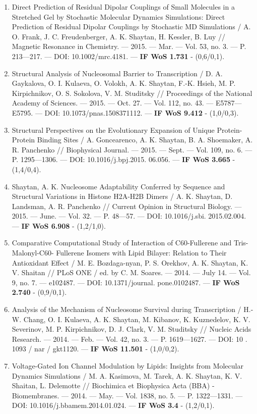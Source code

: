 \begin{frame}[allowframebreaks]
\begin{enumerate}
 \item  Direct Prediction of Residual Dipolar Couplings of Small Molecules in a Stretched Gel by Stochastic Molecular Dynamics Simulations: Direct Prediction of Residual Dipolar Couplings by Stochastic MD Simulations / A. O. Frank, J. C. Freudenberger, A. K. Shaytan, H. Kessler, B. Luy // Magnetic Resonance in Chemistry. –– 2015. –– Mar. –– Vol. 53, no. 3. –– P. 213––217. –– DOI: 10.1002/mrc.4181. –– \textbf{IF WoS 1.731} - (0,6/0,1).
 \item  Structural Analysis of Nucleosomal Barrier to Transcription / D. A. Gaykalova, O. I. Kulaeva, O. Volokh, A. K. Shaytan, F.-K. Hsieh, M. P. Kirpichnikov, O. S. Sokolova, V. M. Studitsky // Proceedings of the National Academy of Sciences. –– 2015. –– Oct. 27. –– Vol. 112,
no. 43. –– E5787––E5795. –– DOI: 10.1073/pnas.1508371112. –– \textbf{IF WoS 9.412} - (1,0/0,3).
 \item  Structural Perspectives on the Evolutionary Expansion of Unique Protein-Protein Binding Sites / A. Goncearenco, A. K. Shaytan, B. A. Shoemaker, A. R. Panchenko // Biophysical Journal. –– 2015. –– Sept. –– Vol. 109, no. 6. –– P. 1295––1306. –– DOI: 10.1016/j.bpj.2015. 06.056. –– \textbf{IF WoS 3.665} - (1,4/0,4).
 \item  Shaytan, A. K. Nucleosome Adaptability Conferred by Sequence and Structural Variations in Histone H2A-H2B Dimers / A. K. Shaytan, D. Landsman, A. R. Panchenko // Current Opinion in Structural Biology. –– 2015. –– June. –– Vol. 32. –– P. 48––57. –– DOI: 10.1016/j.sbi. 2015.02.004. –– \textbf{IF WoS 6.908} - (1,2/1,0).
 \item  Comparative Computational Study of Interaction of C60-Fullerene and Tris-Malonyl-C60- Fullerene Isomers with Lipid Bilayer: Relation to Their Antioxidant Effect / M. E. Bozdaga-nyan, P. S. Orekhov, A. K. Shaytan, K. V. Shaitan // PLoS ONE / ed. by C. M. Soares. –– 2014. –– July 14. –– Vol. 9, no. 7. –– e102487. –– DOI: 10.1371/journal. pone.0102487. –– \textbf{IF WoS 2.740} - (0,9/0,1).
 \item  Analysis of the Mechanism of Nucleosome Survival during Transcription / H.-W. Chang, O. I. Kulaeva, A. K. Shaytan, M. Kibanov, K. Kuznedelov, K. V. Severinov, M. P. Kirpichnikov, D. J. Clark, V. M. Studitsky // Nucleic Acids Research. –– 2014. –– Feb. –– Vol. 42,
no. 3. –– P. 1619––1627. –– DOI: 10 . 1093 / nar / gkt1120. –– \textbf{IF WoS 11.501} - (1,0/0,2).
 \item  Voltage-Gated Ion Channel Modulation by Lipids: Insights from Molecular Dynamics Simulations / M. A. Kasimova, M. Tarek, A. K. Shaytan, K. V. Shaitan, L. Delemotte // Biochimica et Biophysica Acta (BBA) - Biomembranes. –– 2014. –– May. –– Vol. 1838, no. 5. –– P. 1322––1331. –– DOI: 10.1016/j.bbamem.2014.01.024. –– \textbf{IF WoS 3.4} - (1,2/0,1).

\end{enumerate}
\end{frame}
